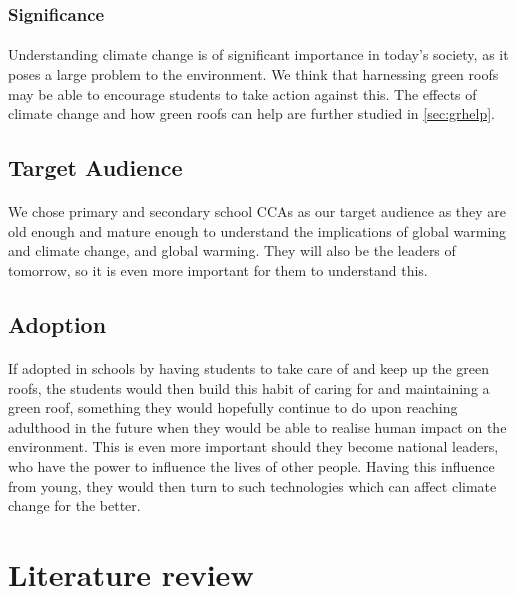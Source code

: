 \documentclass[a4paper]{article}
\begin{document}
\begin{multicols}{2}
  \subsubsection{Significance}
  \paragraph{} Understanding climate change is of significant importance
  in today's society, as it poses a large problem to the environment.
  We think that harnessing green roofs may be able to encourage students
  to take action against this. The effects of climate change and how green
  roofs can help are further studied in \cref{sec:grhelp}.

  \subsection{Target Audience} \label{ssec:target-aud}
  \paragraph{} We chose primary and secondary school CCAs as our target audience as
  they are old enough and mature enough to understand the implications
  of global warming and climate change, and global warming. They will
  also be the leaders of tomorrow, so it is even more important for them
  to understand this.


  \subsection{Adoption}
  \paragraph{} If adopted in schools by having students to take care
  of and keep up the green roofs, the students would then build this
  habit of caring for and maintaining a green roof, something they would
  hopefully continue to do upon reaching adulthood in the future when
  they would be able to realise human impact on the environment. This is
  even more important should they become national leaders, who have the
  power to influence the lives of other people. Having this influence
  from young, they would then turn to such technologies which can affect
  climate change for the better.

  \section{Literature review}

\end{multicols}
\end{document}
